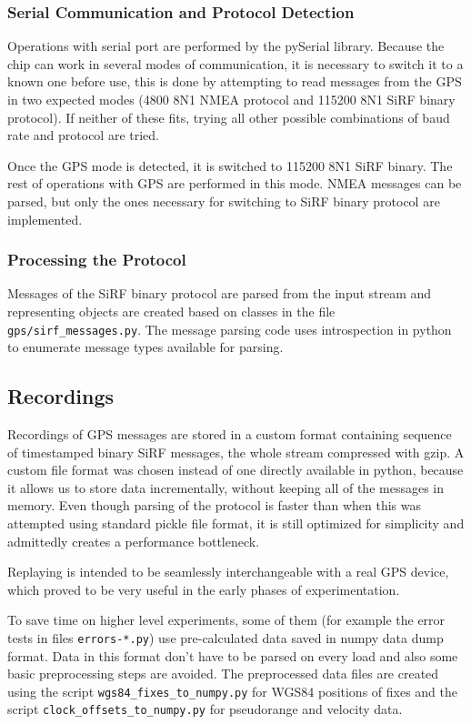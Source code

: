 \subsubsection{Serial Communication and Protocol Detection}
Operations with serial port are performed by the pySerial library.
Because the chip can work in several modes of communication, it is necessary to
switch it to a known one before use, this is done by attempting to read messages
from the GPS in two expected modes (4800 8N1 NMEA protocol and 115200 8N1 SiRF
binary protocol). If neither of these fits, trying all other possible
combinations of baud rate and protocol are tried.

Once the GPS mode is detected, it is switched to 115200 8N1 SiRF binary.
The rest of operations with GPS are performed in this mode.
NMEA messages can be parsed, but only the ones necessary for switching to
SiRF binary protocol are implemented.

\subsubsection{Processing the Protocol}
Messages of the SiRF binary protocol are parsed from the input stream and
representing objects are created based on classes in the file \verb=gps/sirf_messages.py=.
The message parsing code uses introspection in python to enumerate message types
available for parsing.

\subsection{Recordings}
\label{sec:impl-recordings}
Recordings of GPS messages are stored in a custom format containing sequence
of timestamped binary SiRF messages, the whole stream compressed with gzip.
A custom file format was chosen instead of one directly available in python,
because it allows us to store data incrementally, without keeping all of the
messages in memory.
Even though parsing of the protocol is faster than when this was attempted
using standard pickle file format, it is still optimized for simplicity
and admittedly creates a performance bottleneck.

Replaying is intended to be seamlessly interchangeable with a real GPS device,
which proved to be very useful in the early phases of experimentation.

To save time on higher level experiments, some of them (for example the error tests
in files \verb=errors-*.py=)
use pre-calculated data saved in numpy data dump format.
Data in this format don't have to be parsed on every load and also some basic
preprocessing steps are avoided.
The preprocessed data files are created using the script \verb=wgs84_fixes_to_numpy.py=
for WGS84 positions of fixes and the script \verb=clock_offsets_to_numpy.py= for pseudorange
and velocity data.

